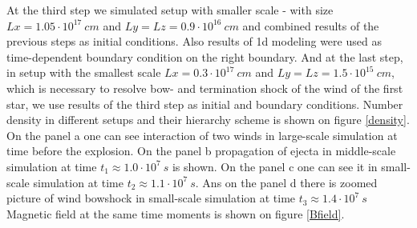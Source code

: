 \documentclass{article}
\begin{document}
	At the third step we simulated setup with smaller scale - with size $Lx = 1.05\cdot 10^{17}~cm$ and $Ly = Lz = 0.9\cdot 10^{16}~cm$ and combined results of the previous steps as initial conditions. Also results of 1d modeling were used as time-dependent boundary condition on the right boundary. And at the last step, in setup with the smallest scale $Lx = 0.3\cdot 10^{17}~cm$ and $Ly = Lz = 1.5\cdot 10^{15}~cm$, which is necessary to resolve bow- and termination shock of the wind of the first star, we use results of the third step as initial and boundary conditions. Number density in different setups and their hierarchy scheme is shown on figure \ref{density}. On the panel a one can see interaction of two winds in large-scale simulation at time before the explosion. On the panel b propagation of ejecta in middle-scale simulation at time $t_1 \approx 1.0\cdot10^7~s$ is shown. On the panel c one can see it in small-scale simulation at time $t_2 \approx 1.1\cdot10^7~s$. Ans on the panel d there is zoomed picture of wind bowshock in small-scale simulation at time $t_3 \approx 1.4\cdot10^7~s$ Magnetic field at the same time moments is shown on figure \ref{Bfield}.
\end{document}
